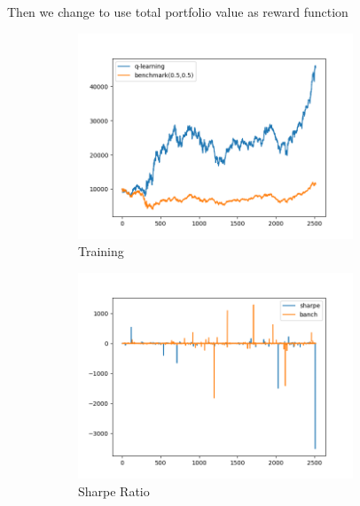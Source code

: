 \newpage
Then we change to use total portfolio value as reward function
\begin{figure}[H]
\begin{subfigure}{.5\textwidth}%
\centering
\includegraphics[clip, width=0.9\textwidth]{Graphics/New_try_rewardpv.png} \caption{Training} 
\end{subfigure}%
\begin{subfigure}{.5\textwidth}%
\centering
\includegraphics[clip, width=0.9\textwidth]{Graphics/new_try_rewardpvS.png} \caption{Sharpe Ratio}
\end{subfigure}%
\vspace{0.4cm}
\begin{subfigure}{.5\textwidth}%
\centering

\end{subfigure}
\end{figure}
